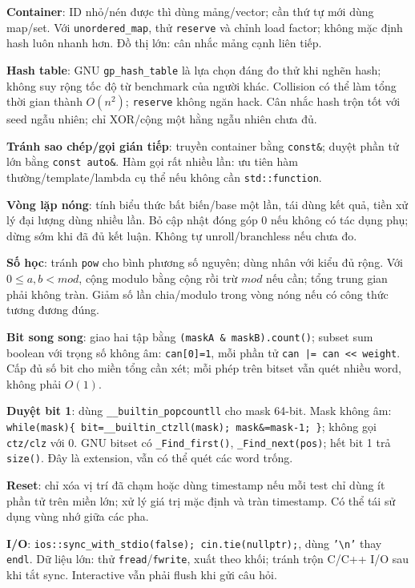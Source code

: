 \textbf{Container}: ID nhỏ/nén được thì dùng mảng/vector; cần thứ tự mới dùng map/set. Với \texttt{unordered\_map}, thử \texttt{reserve} và chỉnh load factor; không mặc định hash luôn nhanh hơn. Đồ thị lớn: cân nhắc mảng cạnh liên tiếp.

\textbf{Hash table}: GNU \texttt{gp\_hash\_table} là lựa chọn đáng đo thử khi nghẽn hash; không suy rộng tốc độ từ benchmark của người khác. Collision có thể làm tổng thời gian thành $O(n^2)$; \texttt{reserve} không ngăn hack. Cân nhắc hash trộn tốt với seed ngẫu nhiên; chỉ XOR/cộng một hằng ngẫu nhiên chưa đủ.

\textbf{Tránh sao chép/gọi gián tiếp}: truyền container bằng \texttt{const\&}; duyệt phần tử lớn bằng \texttt{const auto\&}. Hàm gọi rất nhiều lần: ưu tiên hàm thường/template/lambda cụ thể nếu không cần \texttt{std::function}.

\textbf{Vòng lặp nóng}: tính biểu thức bất biến/base một lần, tái dùng kết quả, tiền xử lý đại lượng dùng nhiều lần. Bỏ cập nhật đóng góp $0$ nếu không có tác dụng phụ; dừng sớm khi đã đủ kết luận. Không tự unroll/branchless nếu chưa đo.

\textbf{Số học}: tránh \texttt{pow} cho bình phương số nguyên; dùng nhân với kiểu đủ rộng. Với $0\le a,b<mod$, cộng modulo bằng cộng rồi trừ $mod$ nếu cần; tổng trung gian phải không tràn. Giảm số lần chia/modulo trong vòng nóng nếu có công thức tương đương đúng.

\textbf{Bit song song}: giao hai tập bằng \texttt{(maskA \& maskB).count()}; subset sum boolean với trọng số không âm: \texttt{can[0]=1}, mỗi phần tử \texttt{can |= can << weight}. Cấp đủ số bit cho miền tổng cần xét; mỗi phép trên bitset vẫn quét nhiều word, không phải $O(1)$.

\textbf{Duyệt bit 1}: dùng \texttt{\_\_builtin\_popcountll} cho mask 64-bit. Mask không âm: \texttt{while(mask)\{ bit=\_\_builtin\_ctzll(mask); mask\&=mask-1; \}}; không gọi \texttt{ctz/clz} với $0$. GNU bitset có \texttt{\_Find\_first()}, \texttt{\_Find\_next(pos)}; hết bit 1 trả \texttt{size()}. Đây là extension, vẫn có thể quét các word trống.

\textbf{Reset}: chỉ xóa vị trí đã chạm hoặc dùng timestamp nếu mỗi test chỉ dùng ít phần tử trên miền lớn; xử lý giá trị mặc định và tràn timestamp. Có thể tái sử dụng vùng nhớ giữa các pha.

\textbf{I/O}: \texttt{ios::sync\_with\_stdio(false); cin.tie(nullptr);}, dùng \texttt{'\textbackslash n'} thay \texttt{endl}. Dữ liệu lớn: thử \texttt{fread}/\texttt{fwrite}, xuất theo khối; tránh trộn C/C++ I/O sau khi tắt sync. Interactive vẫn phải flush khi gửi câu hỏi.
